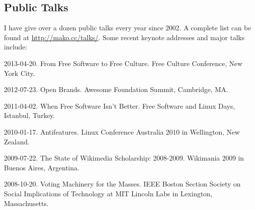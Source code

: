 \documentclass[10pt]{article}
\newenvironment{cvlist}{
\begin{list}{}{\leftmargin=3.0em \itemindent=-3.0em}
  \setlength{\itemsep}{0pt}
  \setlength{\parskip}{0em}
  \setlength{\parsep}{1em}
  \setlength{\parindent}{0em}}
{\vspace{1em}
\end{list}}
\begin{document}
\vspace{2.5em}

\subsection{Public Talks}

I have give over a dozen public talks every year since 2002. A complete list can be found at \url{http://mako.cc/talks/}. Some recent keynote addresses and major talks include:

\begin{cvlist}
\item 2013-04-20. From Free Software to Free Culture. Free Culture Conference, New York City.
\item 2012-07-23. Open Brands. Awesome Foundation Summit, Cambridge, MA.
\item 2011-04-02. When Free Software Isn't Better. Free Software and Linux Days, Istanbul, Turkey.
\item 2010-01-17. Antifeatures. Linux Conference Australia 2010 in Wellington, New Zealand. %
\item 2009-07-22. The State of Wikimedia Scholarship: 2008-2009. Wikimania 2009 in Buenos Aires, Argentina.
\item 2008-10-20. Voting Machinery for the Masses. IEEE Boston Section Society on Social Implications of Technology at MIT Lincoln Labs in Lexington, Massachusetts.

\end{cvlist}
\end{document}
